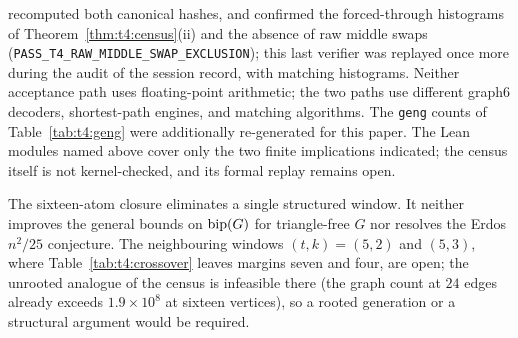 recomputed both canonical hashes, and confirmed the forced-through
histograms of Theorem~\ref{thm:t4:census}(ii) and the absence of raw
middle swaps (\texttt{PASS\_T4\_RAW\_MIDDLE\_SWAP\_EXCLUSION}); this
last verifier was replayed once more during the audit of the session
record, with matching histograms. Neither acceptance path uses
floating-point arithmetic; the two paths use different graph6
decoders, shortest-path engines, and matching algorithms. The
\texttt{geng} counts of Table~\ref{tab:t4:geng} were additionally
re-generated for this paper. The Lean modules named above cover only
the two finite implications indicated; the census itself is not
kernel-checked, and its formal replay remains open.

\begin{remark}[Scope]\label{rem:t4:scope}
The sixteen-atom closure eliminates a single structured window. It
neither improves the general bounds on \(\operatorname{bip}(G)\) for triangle-free
\(G\) nor resolves the Erdos \(n^2/25\) conjecture. The neighbouring
windows \((t,k)=(5,2)\) and \((5,3)\), where
Table~\ref{tab:t4:crossover} leaves margins seven and four, are open;
the unrooted analogue of the census is infeasible there (the graph
count at \(24\) edges already exceeds \(1.9\times10^8\) at sixteen
vertices), so a rooted generation or a structural argument would be
required.
\end{remark}
